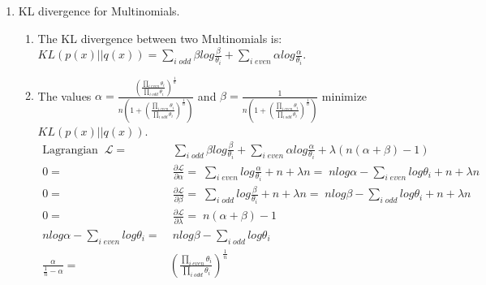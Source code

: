 \begin{enumerate}
\begin{enumerate}
\end{enumerate}
\item KL divergence for Multinomials. 

\begin{enumerate}
\item The KL divergence between two Multinomials is: $KL(p(x)||q(x))=\sum_{i\; odd}\beta log\frac{\beta}{\theta_{i}}+\sum_{i\; even}\alpha log\frac{\alpha}{\theta_{i}}$.
\item The values $\alpha=\frac{(\frac{\prod_{i\; even}\theta_{i}}{\prod_{i\; odd}\theta_{i}})^{\frac{1}{n}}}{n(1+(\frac{\prod_{i\; even}\theta_{i}}{\prod_{i\; odd}\theta_{i}})^{\frac{1}{n}})}$
and $\beta=\frac{1}{n(1+(\frac{\prod_{i\; even}\theta_{i}}{\prod_{i\; odd}\theta_{i}})^{\frac{1}{n}})}$
minimize $KL(p(x)||q(x))$. \begin{align*}
\textrm{Lagrangian}\;\;\mathcal{L}= & \;\sum_{i\; odd}\beta log\frac{\beta}{\theta_{i}}+\sum_{i\; even}\alpha log\frac{\alpha}{\theta_{i}}+\lambda(n(\alpha+\beta)-1)\\
0= & \;\frac{\partial\mathcal{L}}{\partial\alpha}=\;\sum_{i\; even}log\frac{\alpha}{\theta_{i}}+n+\lambda n=\; nlog\alpha-\sum_{i\; even}log\theta_{i}+n+\lambda n\\
0= & \;\frac{\partial\mathcal{L}}{\partial\beta}=\;\sum_{i\; odd}log\frac{\beta}{\theta_{i}}+n+\lambda n=\; nlog\beta-\sum_{i\; odd}log\theta_{i}+n+\lambda n\\
0= & \;\frac{\partial\mathcal{L}}{\partial\lambda}=\; n(\alpha+\beta)-1\\
nlog\alpha-\sum_{i\; even}log\theta_{i}= & \; nlog\beta-\sum_{i\; odd}log\theta_{i}\\
\frac{\alpha}{\frac{1}{n}-\alpha}= & (\frac{\prod_{i\; even}\theta_{i}}{\prod_{i\; odd}\theta_{i}})^{\frac{1}{n}}\end{align*}
 
\end{enumerate}
\end{enumerate}
